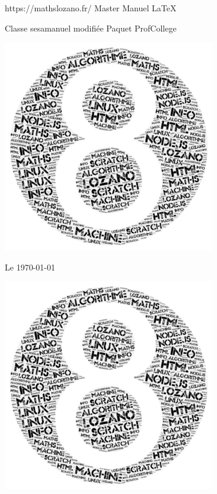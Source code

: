 \pagestyle{backCover}
\parindent=0pt
https://mathslozano.fr/  Master Manuel \LaTeX 

Classe sesamanuel modifiée Paquet ProfCollege
\begin{center}
    \includegraphics[scale=0.5]{images/8.png}%
\end{center}
\hrulefill
\def\currentpath{./resume}              %

\hrulefill
\vspace*{1cm}
\begin{center}\bfseries\Large
    \myAuthorName
\end{center}
    
\begin{flushright}
       Le \today 
\end{flushright}   
\begin{center}
    \includegraphics[scale=0.5]{images/8.png}%
\end{center}
